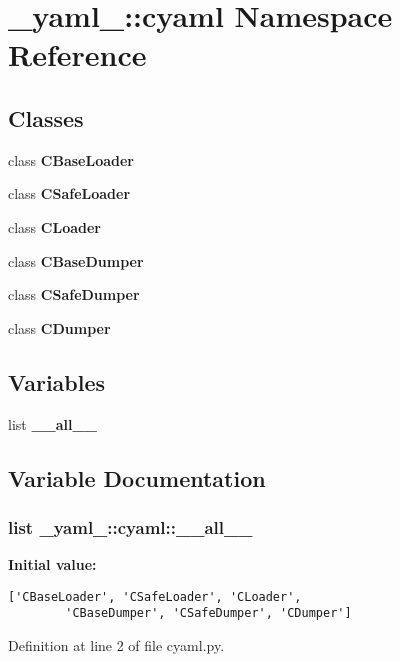 \section{\_\-yaml\_\-::cyaml Namespace Reference}
\label{namespace__yaml___1_1cyaml}


\subsection*{Classes}
\begin{CompactItemize}
\item 
class {\bf CBaseLoader}
\item 
class {\bf CSafeLoader}
\item 
class {\bf CLoader}
\item 
class {\bf CBaseDumper}
\item 
class {\bf CSafeDumper}
\item 
class {\bf CDumper}
\end{CompactItemize}
\subsection*{Variables}
\begin{CompactItemize}
\item 
list {\bf \_\-\_\-all\_\-\_\-}
\end{CompactItemize}


\subsection{Variable Documentation}
\subsubsection{\setlength{\rightskip}{0pt plus 5cm}list {\bf \_\-yaml\_\-::cyaml::\_\-\_\-all\_\-\_\-}\hspace{0.3cm}{\tt  [static]}}\label{namespace__yaml___1_1cyaml_d4393953d48d61fe51f9dd25b0ef7637}


\textbf{Initial value:}

\begin{Code}\begin{verbatim}['CBaseLoader', 'CSafeLoader', 'CLoader',
        'CBaseDumper', 'CSafeDumper', 'CDumper']
\end{verbatim}
\end{Code}


Definition at line 2 of file cyaml.py.